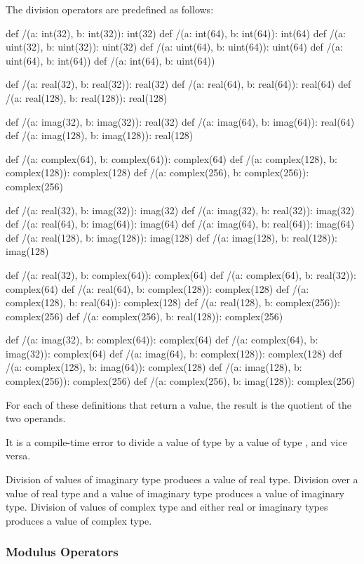 The division operators are predefined as follows:
\begin{chapel}
def /(a: int(32), b: int(32)): int(32)
def /(a: int(64), b: int(64)): int(64)
def /(a: uint(32), b: uint(32)): uint(32)
def /(a: uint(64), b: uint(64)): uint(64)
def /(a: uint(64), b: int(64))
def /(a: int(64), b: uint(64))

def /(a: real(32), b: real(32)): real(32)
def /(a: real(64), b: real(64)): real(64)
def /(a: real(128), b: real(128)): real(128)

def /(a: imag(32), b: imag(32)): real(32)
def /(a: imag(64), b: imag(64)): real(64)
def /(a: imag(128), b: imag(128)): real(128)

def /(a: complex(64), b: complex(64)): complex(64)
def /(a: complex(128), b: complex(128)): complex(128)
def /(a: complex(256), b: complex(256)): complex(256)

def /(a: real(32), b: imag(32)): imag(32)
def /(a: imag(32), b: real(32)): imag(32)
def /(a: real(64), b: imag(64)): imag(64)
def /(a: imag(64), b: real(64)): imag(64)
def /(a: real(128), b: imag(128)): imag(128)
def /(a: imag(128), b: real(128)): imag(128)

def /(a: real(32), b: complex(64)): complex(64)
def /(a: complex(64), b: real(32)): complex(64)
def /(a: real(64), b: complex(128)): complex(128)
def /(a: complex(128), b: real(64)): complex(128)
def /(a: real(128), b: complex(256)): complex(256)
def /(a: complex(256), b: real(128)): complex(256)

def /(a: imag(32), b: complex(64)): complex(64)
def /(a: complex(64), b: imag(32)): complex(64)
def /(a: imag(64), b: complex(128)): complex(128)
def /(a: complex(128), b: imag(64)): complex(128)
def /(a: imag(128), b: complex(256)): complex(256)
def /(a: complex(256), b: imag(128)): complex(256)
\end{chapel}
For each of these definitions that return a value, the result is the
quotient of the two operands.

It is a compile-time error to divide a value of type  by
a value of type , and vice versa.

Division of values of imaginary type produces a value of real type.
Division over a value of real type and a value of imaginary type
produces a value of imaginary type.  Division of values of complex
type and either real or imaginary types produces a value of complex
type.

\subsubsection{Modulus Operators}
\label{Modulus_Operators}

